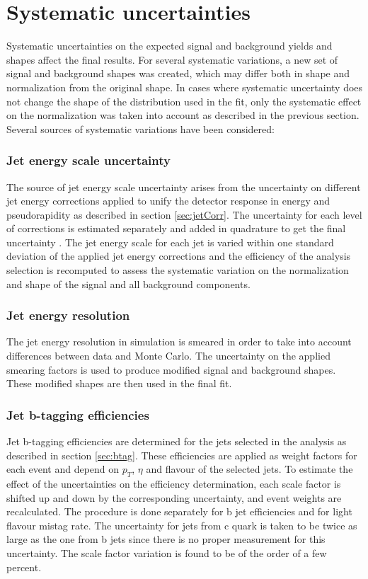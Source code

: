 
\section{Systematic uncertainties}
\label{sec:syst}

Systematic uncertainties on the expected signal and background yields and shapes affect
the final results. For several systematic variations, a new set of signal and background shapes was created, which may differ both in shape and normalization from the original shape. 
In cases where systematic uncertainty does not change the shape of the distribution used in the fit, only the systematic effect on the normalization was taken into account as described in the previous section. Several sources of systematic variations have been considered:
\subsubsection*{Jet energy scale uncertainty}
		The source of jet energy scale uncertainty arises from the uncertainty on different jet energy corrections applied to unify the detector response in energy and pseudorapidity as described in section \ref{sec:jetCorr}. The uncertainty for each level of corrections is estimated separately and added in quadrature to get the final uncertainty \cite{Chatrchyan:2011ds}. The jet energy scale for each jet is varied within one standard deviation of the applied jet energy corrections and the efficiency of the analysis selection is recomputed to assess the systematic variation on the normalization and shape of the signal and all background components.
\subsubsection*{Jet energy resolution}
        The jet energy resolution in simulation is smeared in order to take into account differences between data and Monte Carlo. The uncertainty on the applied smearing factors is used to produce modified signal and background shapes.  These modified shapes are then used in the final fit.
\subsubsection*{Jet b-tagging efficiencies}
        Jet b-tagging efficiencies are determined for the jets selected in the analysis as described in section \ref{sec:btag}. These efficiencies are applied as weight factors for each event and depend on $p_T$, $\eta$ and flavour of the selected jets. To estimate the effect of the uncertainties on the efficiency determination, each scale factor is shifted up and down by the corresponding uncertainty, and event weights are recalculated. The procedure is done separately for b jet efficiencies and for light flavour mistag rate. The uncertainty for jets from c quark is taken to be twice as large as the one from b jets since there is no proper measurement for this uncertainty. The scale factor variation is found to be of the order of a few percent. 
